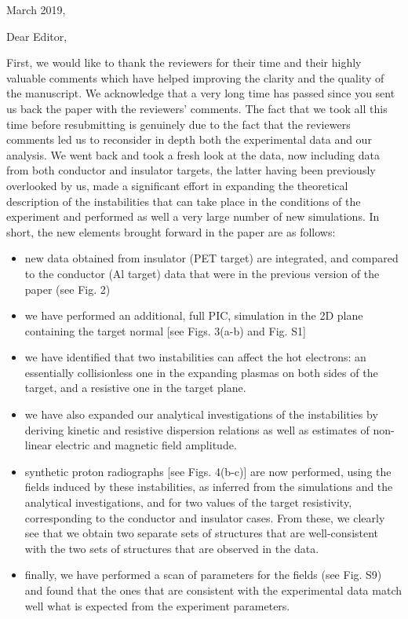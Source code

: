 \documentclass[aps,showpacs,superscriptaddress]{revtex4}%
\begin{document}
\renewcommand\thefigure{A\arabic{figure}}  
March 2019,

Dear Editor,

First, we would like to thank the reviewers for their time and their highly valuable comments which have helped improving the clarity and the quality of the manuscript. We acknowledge that a very long time has passed since you sent us back the paper with the reviewers' comments. 
The fact that we took all this time before resubmitting is genuinely due to the fact that the reviewers comments led us to reconsider in depth both the experimental data and our analysis. We went back and took a fresh look at the data, now including data from both conductor and insulator targets, the latter having been previously overlooked by us, made a significant effort in expanding the theoretical description of the instabilities that can take place in the conditions of the experiment and performed as well a very large number of new simulations. 
In short, the new elements brought forward in the paper are as follows:
\begin{itemize}
    \item new data obtained from insulator (PET target) are integrated, and compared to the conductor (Al target) data that were in the previous version of the paper (see Fig. 2)
    \item we have performed an additional, full PIC, simulation in the 2D plane containing the target normal [see Figs. 3(a-b) and Fig. S1]
    \item we have identified that two instabilities can affect the hot electrons: an essentially  collisionless one in the expanding plasmas on both sides of the target, and a resistive one in the target plane. 
    \item we have also expanded our analytical investigations of the instabilities by deriving kinetic and resistive dispersion relations as well as  estimates of    non-linear electric and magnetic field amplitude.
    \item synthetic proton radiographs [see Figs. 4(b-c)] are now performed, using the fields induced by these instabilities, as inferred from the simulations and the analytical investigations, and for two values of the target resistivity, corresponding to the conductor and insulator cases. From these, we clearly see that we obtain two separate sets of structures that are well-consistent with the two sets of structures that are observed in the data. 
    \item finally, we have performed a scan of parameters for the fields (see Fig. S9) and found that the ones that are consistent with the experimental data match well what is expected from the experiment parameters. 
\end{itemize}
\end{document}
